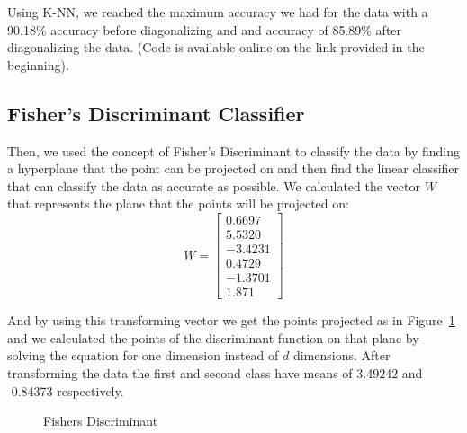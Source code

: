 \documentclass[11pt, oneside]{article}   	%
\begin{document}
Using K-NN, we reached the maximum accuracy we had for the data with a 90.18\% accuracy before diagonalizing and and accuracy of 85.89\% after diagonalizing the data. (Code is available online on the link provided in the beginning).

\subsection{Fisher's Discriminant Classifier}
Then, we used the concept of Fisher's Discriminant to classify the data by finding a hyperplane that the point can be projected on and then find the linear classifier that can classify the data as accurate as possible.
We calculated the vector $W$ that represents the plane that the points will be projected on:
$$W = \begin{bmatrix}
0.6697 \\ 5.5320 \\ -3.4231 \\ 0.4729 \\ -1.3701 \\ 1.871
\end{bmatrix}$$

And by using this transforming vector we get the points projected as in Figure~\ref{fig:fishers-disc} and we calculated the points of the discriminant function on that plane by solving the equation for one dimension instead of $d$ dimensions. After transforming the data the first and second class have means of 3.49242 and -0.84373 respectively.

\begin{figure}
\begin{center}
\end{center}
\caption{Fishers Discriminant}
\label{fig:fishers-disc}
\end{figure}
\end{document}
